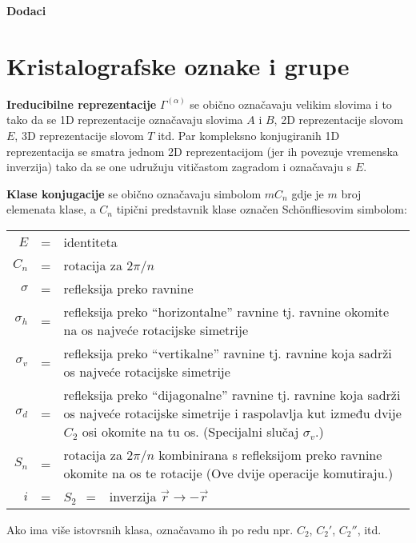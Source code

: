
\appendix

\cleardoublepage
\vspace*{8cm}
\thispagestyle{empty}
\begin{flushright}
\Huge \bfseries Dodaci
\end{flushright}
\cleardoublepage

\chapter{Kristalografske oznake i grupe}
\label{sec:kristalografija}
\textbf{Ireducibilne reprezentacije} $\Gamma^{(\alpha)}$ se obično označavaju
velikim slovima i to tako da se 1D reprezentacije označavaju slovima
$A$ i $B$, 2D reprezentacije slovom $E$, 3D reprezentacije slovom $T$
itd. Par kompleksno konjugiranih 1D reprezentacija se smatra jednom
2D reprezentacijom (jer ih povezuje vremenska inverzija) tako da se
one udružuju vitičastom zagradom i označavaju s $E$.

\textbf{Klase konjugacije} se obično označavaju simbolom $mC_n$ gdje je $m$
broj elemenata klase, a $C_n$ tipični predstavnik klase označen
Sch\"{o}nfliesovim simbolom:
\begin{center}
\begin{tabular}{rcp{10cm}}
$E$ & = & identiteta \\
$C_n$ & = & rotacija za $2\pi/n$ \\
$\sigma$ & = & refleksija preko ravnine \\
$\sigma_{h}$ & = & refleksija preko ``horizontalne'' ravnine tj. ravnine
  okomite na os najveće rotacijske simetrije \\
$\sigma_{v}$ & = & refleksija preko ``vertikalne'' ravnine tj. ravnine
  koja sadrži os najveće rotacijske simetrije \\
$\sigma_{d}$ & = & refleksija preko ``dijagonalne'' ravnine tj. ravnine
  koja sadrži os najveće rotacijske simetrije i raspolavlja kut između
  dvije $C_2$ osi okomite na tu os. (Specijalni slučaj $\sigma_{v}$.) \\
$S_n$  & = & rotacija za $2\pi/n$ kombinirana s refleksijom preko ravnine
   okomite na os te rotacije (Ove dvije operacije komutiraju.) \\
$i$ & = &  $S_2 \;\, = \;\,$  inverzija $\vec{r} \to -\vec{r}$
\end{tabular}
\end{center}
Ako ima više istovrsnih klasa, označavamo ih po redu npr.
$C_{2}$, $C_{2}'$, $C_{2}''$, itd.

